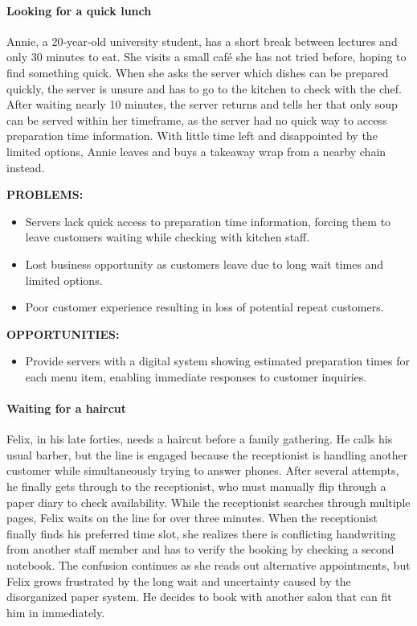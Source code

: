 \documentclass[]{VUMIFTemplateClass}
\newcommand{\subsubsubsection}[1]{\paragraph{#1}}
\begin{document}
\subsubsubsection{Looking for a quick lunch}

Annie, a 20‑year‑old university student, has a short break between lectures and
only 30 minutes to eat. She visits a small café she has not tried before, hoping
to find something quick. When she asks the server which dishes can be prepared
quickly, the server is unsure and has to go to the kitchen to check with the
chef. After waiting nearly 10 minutes, the server returns and tells her that
only soup can be served within her timeframe, as the server had no quick way to
access preparation time information. With little time left and disappointed by
the limited options, Annie leaves and buys a takeaway wrap from a nearby chain
instead.

\textbf{PROBLEMS:}
\begin{itemize}
    \item Servers lack quick access to preparation time information, forcing them to leave customers waiting while checking with kitchen staff.
    \item Lost business opportunity as customers leave due to long wait times and limited options.
    \item Poor customer experience resulting in loss of potential repeat customers.
\end{itemize}
\textbf{OPPORTUNITIES:}
\begin{itemize}
    \item Provide servers with a digital system showing estimated preparation times for each menu item, enabling immediate responses to customer inquiries.
\end{itemize}

\newpage


\subsubsubsection{Waiting for a haircut}

Felix, in his late forties, needs a haircut before a family gathering. He calls
his usual barber, but the line is engaged because the receptionist is handling
another customer while simultaneously trying to answer phones. After several
attempts, he finally gets through to the receptionist, who must manually flip
through a paper diary to check availability. While the receptionist searches
through multiple pages, Felix waits on the line for over three minutes. When
the receptionist finally finds his preferred time slot, she realizes there is
conflicting handwriting from another staff member and has to verify the booking
by checking a second notebook. The confusion continues as she reads out
alternative appointments, but Felix grows frustrated by the long wait and
uncertainty caused by the disorganized paper system. He decides to book with
another salon that can fit him in immediately.
\end{document}

